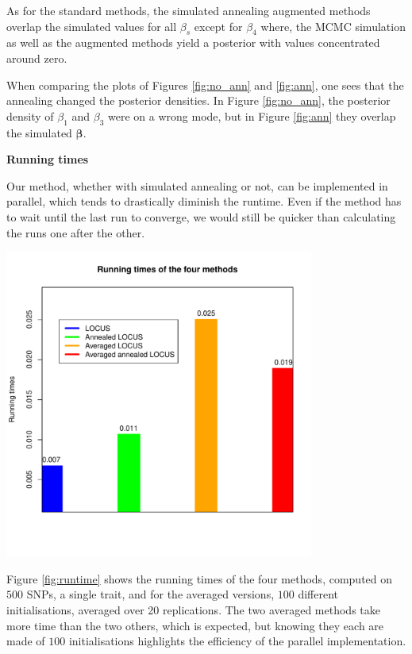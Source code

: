 \documentclass[final]{beamer}
\newenvironment{Figure}
  {\par\noindent\minipage{\linewidth}}
  {\endminipage\par}
\begin{document}
\begin{multicols*}{3}
As for the standard methods, the simulated annealing augmented methods overlap the simulated values for all $\beta_s$ except for $\beta_4$ where, the MCMC simulation as well as the augmented methods yield a posterior with values concentrated around zero.

When comparing the plots of Figures \ref{fig:no_ann} and \ref{fig:ann}, one sees that the annealing changed the posterior densities. In Figure \ref{fig:no_ann}, the posterior density of $\beta_1$ and $\beta_3$ were on a wrong mode, but in Figure \ref{fig:ann} they overlap the simulated $\boldsymbol{\beta}$. 

\vspace{1em}

\textbf{\large Running times}

\vspace{1em}
Our method, whether with simulated annealing or not, can be implemented in parallel, which tends to drastically diminish the runtime. Even if the method has to wait until the last run to converge, we would still be quicker than calculating the runs one after the other.

\begin{Figure}
\centering
\includegraphics[width=4in,bb= 0 0 550 550]{images/runtimes.pdf}
\end{Figure}
\vspace{1em}
Figure \ref{fig:runtime} shows the running times of the four methods, computed on $500$ SNPs, a single trait, and for the averaged versions, $100$ different initialisations, averaged over 20 replications. The two averaged methods take more time than the two others, which is expected, but knowing they each are made of $100$ initialisations highlights the efficiency of the parallel implementation.


\end{multicols*}
\end{document}
